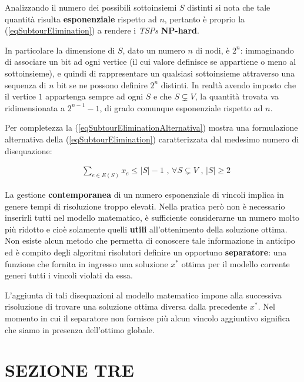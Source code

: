 \documentclass[11pt]{article}
\begin{document}
Analizzando il numero dei possibili sottoinsiemi $S$ distinti si nota che tale quantità risulta \textbf{esponenziale} rispetto ad $n$, pertanto è proprio la (\ref{eqSubtourElimination}) a rendere i \textit{TSPs} \textbf{NP-hard}.

In particolare la dimensione di $S$, dato un numero $n$ di nodi, è $2^n$: immaginando di associare un bit ad ogni vertice (il cui valore definisce se appartiene o meno al sottoinsieme), e quindi di rappresentare un qualsiasi sottoinsieme attraverso una sequenza di $n$ bit se ne possono definire $2^n$ distinti. In realtà avendo imposto che il vertice $1$ appartenga sempre ad ogni $S$ e che $S \subsetneq V$, la quantità trovata va ridimensionata a $2^{n-1} - 1$, di grado comunque esponenziale rispetto ad $n$.

Per completezza la (\ref{eqSubtourEliminationAlternativa}) mostra una formulazione alternativa della (\ref{eqSubtourElimination}) caratterizzata dal medesimo numero di disequazione:

\begin{eqnarray}
\label{eqSubtourEliminationAlternativa}
&\displaystyle{\sum_{e \in E(S)}x_e \leq |S| - 1} \text{ , } \forall S \subsetneq V \text{ , } |S| \geq 2
\end{eqnarray}

La gestione \textbf{contemporanea} di un numero esponenziale di vincoli implica in genere tempi di risoluzione troppo elevati. Nella pratica però non è necessario inserirli tutti nel modello matematico, è sufficiente considerarne un numero molto più ridotto e cioè solamente quelli \textbf{utili} all'ottenimento della soluzione ottima. Non esiste alcun metodo che permetta di conoscere tale informazione in anticipo ed è compito degli algoritmi risolutori definire un opportuno \textbf{separatore}: una funzione che fornita in ingresso una soluzione $x^*$ ottima per il modello corrente generi tutti i vincoli violati da essa.

L'aggiunta di tali disequazioni al modello matematico impone alla successiva risoluzione di trovare una soluzione ottima diversa dalla precedente $x^*$. Nel momento in cui il separatore non fornisce più alcun vincolo aggiuntivo significa che siamo in presenza dell'ottimo globale.

\newpage

\section*{SEZIONE TRE}
\label{sec:SezioneTreS}
\end{document}
